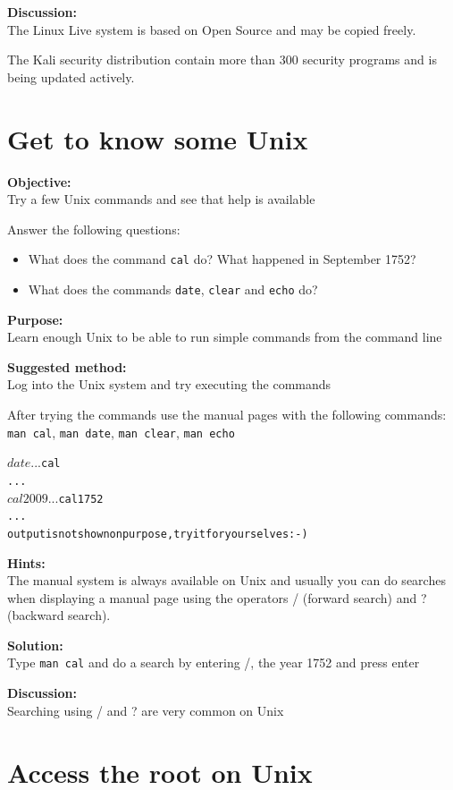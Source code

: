 \documentclass[a4paper,11pt,notitlepage]{report}
\begin{document}
{\bf Discussion:}\\
The Linux Live system is based on Open Source and may be copied freely.

The Kali security distribution contain more than 300 security programs and is being updated actively.

\chapter{Get to know some Unix}
\label{ex:unix-cal}

{\bf Objective:}\\
Try a few Unix commands and see that help is available

Answer the following questions:
\begin{itemize}
\item What does the command \verb+cal+ do? What happened in September 1752?
\item What does the commands \verb+date+, \verb+clear+ and \verb+echo+ do?
\end{itemize}

{\bf Purpose:}\\
Learn enough Unix to be able to run simple commands from the command line

{\bf Suggested method:}\\
Log into the Unix system and try executing the commands

After trying the commands use the manual pages with the following commands:\\
\verb+man cal+, \verb+man date+, \verb+man clear+,
\verb+man echo+

\begin{alltt}
$ date
...
$ cal
...
$ cal 2009
...
$ cal 1752
...
output is not shown on purpose, try it for yourselves :-)
\end{alltt}

{\bf Hints:}\\
The manual system is always available on Unix and usually you can do searches when
displaying a manual page using the operators / (forward search) and ? (backward search).

{\bf Solution:}\\
Type \verb+man cal+ and do a search by entering /, the year 1752 and press enter

{\bf Discussion:}\\
Searching using / and ? are very common on Unix


\chapter{Access the root on Unix}
\label{ex:sudo}
\end{document}
